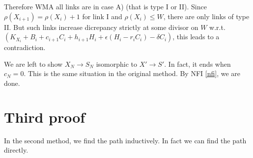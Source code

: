 \documentclass{article}
\begin{document}
Therefore WMA all links are in case A) (that is type I or II). Since $ \rho(X_{i+1})=\rho(X_i)+1 $ for link I and $ \rho(X_i)\leqslant W $, there are only links of type II. But such links increase dicrepancy strictly at some divisor on $ W $ w.r.t. $ (K_{X_i}+B_i+c_{i+1}C_i+h_{i+1}H_i+\epsilon(H_i-r_iC_i)-\delta C_i) $, this leads to a contradiction.

We are left to show $ X_N\to S_N $ isomorphic to $ X'\to S' $. In fact, it ends when $ c_N=0 $. This is the same situation in the original method. By NFI \ref{nfi}, we are done.
\section{Third proof}

In the second method, we find the path inductively. In fact we can find the path directly.
\end{document}
